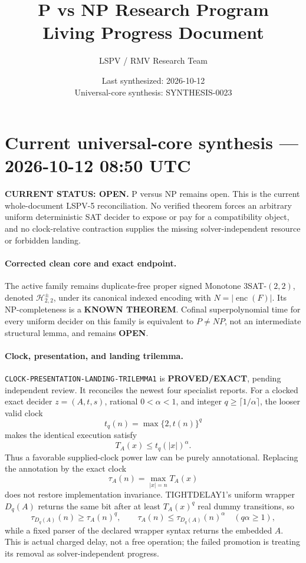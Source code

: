 \documentclass[11pt]{article}
\title{\bfseries P vs NP Research Program\\[0.25em]
\Large Living Progress Document}
\author{LSPV / RMV Research Team}
\date{Last synthesized: 2026-10-12\\ Universal-core synthesis: SYNTHESIS-0023}
\newcommand{\statusproved}{\textcolor{proved}{\textbf{PROVED/EXACT}}}
\newcommand{\statusopen}{\textcolor{openstatus}{\textbf{OPEN}}}
\begin{document}
\section{Current universal-core synthesis --- 2026-10-12 08:50 UTC}

\begin{statusbox}
\textbf{CURRENT STATUS: OPEN.} P versus NP remains open.  This is the current
whole-document LSPV-5 reconciliation.  No verified theorem forces an arbitrary
uniform deterministic SAT decider to expose or pay for a compatibility
object, and no clock-relative contraction supplies the missing
solver-independent resource or forbidden landing.
\end{statusbox}

\paragraph{Corrected clean core and exact endpoint.}
The active family remains duplicate-free proper signed Monotone
\(3\)SAT-\((2,2)\), denoted \(\mathcal H^\pm_{2,2}\), under its canonical
indexed encoding with \(N=|\operatorname{enc}(F)|\).  Its NP-completeness is
a \textbf{KNOWN THEOREM}.  Cofinal superpolynomial time for every uniform
decider on this family is equivalent to \(P\ne NP\), not an intermediate
structural lemma, and remains \statusopen.

\paragraph{Clock, presentation, and landing trilemma.}
\texttt{CLOCK-PRESENTATION-LANDING-TRILEMMA1} is \statusproved, pending
independent review.  It reconciles the newest four specialist reports.
For a clocked exact decider \(z=(A,t,s)\), rational \(0<\alpha<1\), and
integer \(q\ge\lceil1/\alpha\rceil\), the looser valid clock
\[
 t_q(n)=\max\{2,t(n)\}^{q}
\]
makes the identical execution satisfy
\[
                         T_A(x)\le t_q(|x|)^\alpha .
\]
Thus a favorable supplied-clock power law can be purely annotational.
Replacing the annotation by the exact clock
\[
                 \tau_A(n)=\max_{|x|=n}T_A(x)
\]
does not restore implementation invariance.  TIGHTDELAY1's uniform wrapper
\(D_q(A)\) returns the same bit after at least \(T_A(x)^q\) real dummy
transitions, so
\[
 \tau_{D_q(A)}(n)\ge\tau_A(n)^q,
 \qquad
 \tau_A(n)\le\tau_{D_q(A)}(n)^\alpha\quad(q\alpha\ge1),
\]
while a fixed parser of the declared wrapper syntax returns the embedded
\(A\).  This is actual charged delay, not a free operation; the failed
promotion is treating its removal as solver-independent progress.
\end{document}
